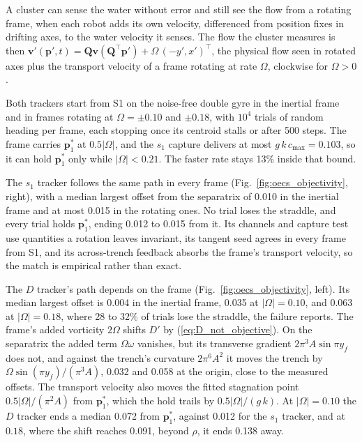 \documentclass[lettersize,journal]{IEEEtran}
\newcommand{\rev}[1]{#1}
\begin{document}
A cluster can sense the water without error and still see the flow from a
rotating frame, when each robot adds its own velocity, differenced from
position fixes in drifting axes, to the water velocity it senses. The flow the cluster measures is then
$\mathbf{v}'(\mathbf{p}', t) = \mathbf{Q}\mathbf{v}(\mathbf{Q}^\top \mathbf{p}')
+ \Omega\,(-y', x')^\top$, the physical flow seen in rotated axes plus the transport velocity of a
frame rotating at rate $\Omega$, clockwise for $\Omega > 0$.

Both trackers start from S1 on the noise-free double gyre in the inertial
frame and in frames rotating at $\Omega = \pm 0.10$ and $\pm \rev{0.18}$,
with $10^4$ trials of random heading per frame, each stopping once its
centroid stalls or after 500 steps. The frame carries
$\mathbf{p}^*_1$ at $0.5|\Omega|$, and the $s_1$ capture delivers at most
$g\,k\,c_{\max} = \rev{0.103}$, so it can hold $\mathbf{p}^*_1$ only while
$|\Omega| < \rev{0.21}$. The faster rate stays \rev{13}\% inside that
bound.

The $s_1$ tracker follows the same path in every frame
(Fig.~\ref{fig:oecs_objectivity}, right), with a median largest offset
from the separatrix of \rev{0.010} in the inertial frame and at most
\rev{0.015} in the rotating ones. No trial loses the straddle, and every
trial holds $\mathbf{p}^*_1$, ending \rev{0.012} to \rev{0.015} from it.
Its channels and capture test use quantities a rotation leaves invariant,
its tangent seed agrees in every frame from S1, and its across-trench
feedback absorbs the frame's transport velocity, so the match is empirical
rather than exact.

The $D$ tracker's path depends on the frame
(Fig.~\ref{fig:oecs_objectivity}, left). Its median largest offset is
\rev{0.004} in the inertial frame, \rev{0.035} at $|\Omega| = 0.10$, and
\rev{0.063} at $|\Omega| = 0.18$, where \rev{28} to \rev{32}\% of trials
lose the straddle, the failure \cite{26} reports. The frame's added
vorticity $2\Omega$ shifts $D'$ by (\ref{eq:D_not_objective}). On the
separatrix the added term $\Omega\omega$ vanishes, but its transverse
gradient $2\pi^3 A\sin\pi y_f$ does not, and against the trench's
curvature $2\pi^6 A^2$ it moves the trench by
$\Omega\sin(\pi y_f)/(\pi^3 A)$, \rev{0.032} and \rev{0.058} at the origin,
close to the measured offsets. The transport velocity also moves the
fitted stagnation point $0.5|\Omega|/(\pi^2 A)$ from $\mathbf{p}^*_1$,
which the hold trails by $0.5|\Omega|/(g\,k)$. At $|\Omega| = 0.10$ the $D$ tracker ends a median
\rev{0.072} from $\mathbf{p}^*_1$, against \rev{0.012} for the $s_1$
tracker, and at $0.18$, where the shift reaches \rev{0.091}, beyond $\rho$,
it ends \rev{0.138} away.
\end{document}
